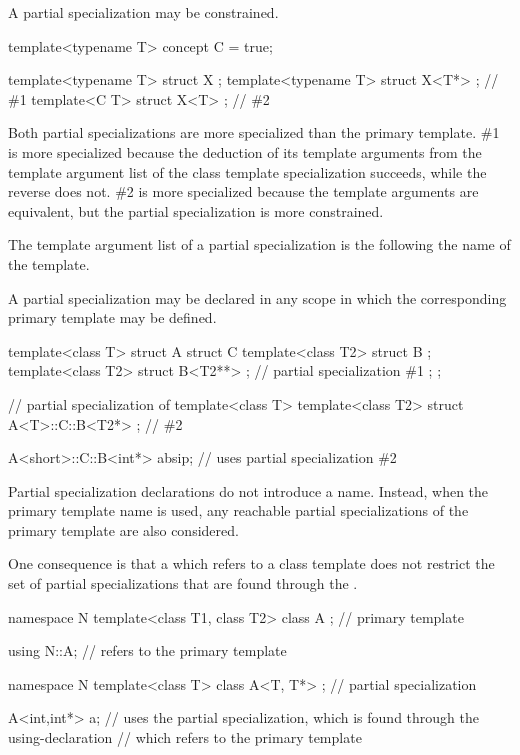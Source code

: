 \pnum
A partial specialization may be constrained.
\begin{example}
\begin{codeblock}
template<typename T> concept C = true;

template<typename T> struct X { };
template<typename T> struct X<T*> { };          // \#1
template<C T> struct X<T> { };                  // \#2
\end{codeblock}
Both partial specializations are more specialized than the primary template.
\#1 is more specialized because the deduction of its template arguments
from the template argument list of the class template specialization succeeds,
while the reverse does not.
\#2 is more specialized because the template arguments are equivalent,
but the partial specialization is more constrained.
\end{example}

\pnum
The template argument list of a partial specialization is
the  following the name of the template.

\pnum
A partial specialization may be declared in any
scope in which the corresponding primary template
may be defined.
\begin{example}
\begin{codeblock}
template<class T> struct A {
  struct C {
    template<class T2> struct B { };
    template<class T2> struct B<T2**> { };      // partial specialization \#1
  };
};

// partial specialization of 
template<class T> template<class T2>
  struct A<T>::C::B<T2*> { };                   // \#2

A<short>::C::B<int*> absip;                     // uses partial specialization \#2
\end{codeblock}
\end{example}

\pnum
Partial specialization declarations do not introduce a name.
Instead, when the primary template name is used, any reachable partial
specializations of the primary template are also considered.
\begin{note}
One consequence is
that a 
which refers to a class template does not restrict the set of partial specializations
that are found through the .
\end{note}
\begin{example}
\begin{codeblock}
namespace N {
  template<class T1, class T2> class A { };     // primary template
}

using N::A;                                     // refers to the primary template

namespace N {
  template<class T> class A<T, T*> { };         // partial specialization
}

A<int,int*> a;      // uses the partial specialization, which is found through the using-declaration
                    // which refers to the primary template
\end{codeblock}
\end{example}

